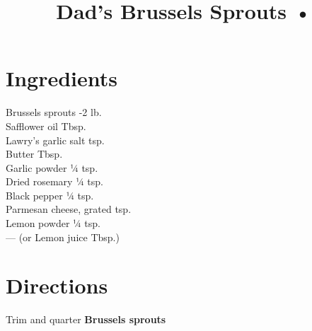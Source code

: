 \documentclass[11pt,letterpaper]{article}
\title{Dad's Brussels Sprouts •}
\author{}
\date{}
\begin{document}
\maketitle
\thispagestyle{empty}

\section*{Ingredients}
\setlength{\columnsep}{20pt}
\begin{multicols}{2}
\noindent
    Brussels sprouts -2 lb. \\
    Safflower oil  Tbsp. \\
    Lawry's garlic salt  tsp. \\
    Butter  Tbsp. \\
    \columnbreak
    Garlic powder \dotfill ¼ tsp. \\
    Dried rosemary \dotfill ¼ tsp. \\
    Black pepper \dotfill ¼ tsp. \\
    Parmesan cheese, grated  tsp. \\
    Lemon powder \dotfill ¼ tsp. \\
    --- (or Lemon juice Tbsp.)
\end{multicols}

\section*{Directions}

\noindent
Trim and quarter \textbf{Brussels sprouts}
\end{document}
